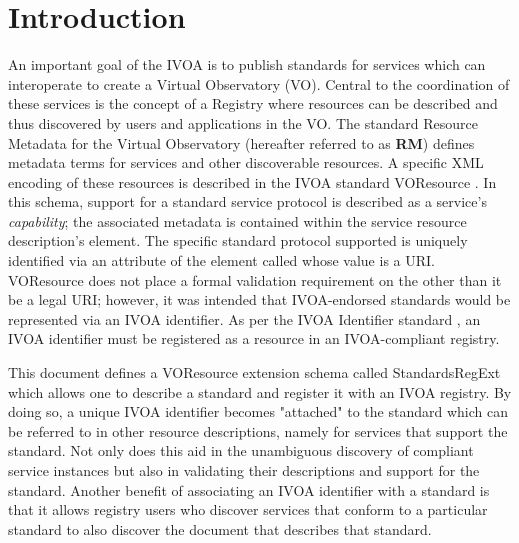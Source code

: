 \documentclass[11pt,a4paper]{ivoa}
\begin{document}
\section{Introduction}

\label{sect:intro}

An important goal of the IVOA is to publish standards for services
which can interoperate to create a Virtual Observatory (VO).  Central
to the coordination of these services is the concept of a Registry
where resources can be described and thus
discovered by users and applications in the VO.  The standard
Resource
Metadata for the Virtual Observatory \citep{2007ivoa.spec.0302H}
(hereafter referred to as \textbf{RM}) defines
metadata terms for services and other discoverable resources.  A
specific XML encoding of these resources is described in the IVOA standard
VOResource \citep{2018ivoa.spec.0625P}.
In this schema, support for a standard service protocol is described
as a service's \emph{capability}; the associated metadata is
contained within the service resource description's
 element.  The
specific standard protocol supported is uniquely identified via an
attribute of the  element called
whose value is a URI.  VOResource does
not place a formal validation requirement on the
 other than it be a legal URI; however, it
was intended that IVOA-endorsed standards would be represented via an
IVOA identifier.  As per the IVOA Identifier standard
\citep{2016ivoa.spec.0523D},
an IVOA identifier must be registered as a
resource in an IVOA-compliant registry.  



This document defines a VOResource extension schema called
StandardsRegExt which allows one to describe a standard
and register it with an IVOA registry.  By doing so, a unique IVOA
identifier becomes "attached" to the standard which can be referred to
in other resource descriptions, namely for services that support the
standard.  Not only does this aid in the unambiguous discovery of
compliant service instances but also in validating their descriptions
and support for the standard.  Another benefit of associating an IVOA
identifier with a standard is that it allows registry users who discover
services that conform to a particular standard to also discover the
document that describes that standard.
\end{document}
